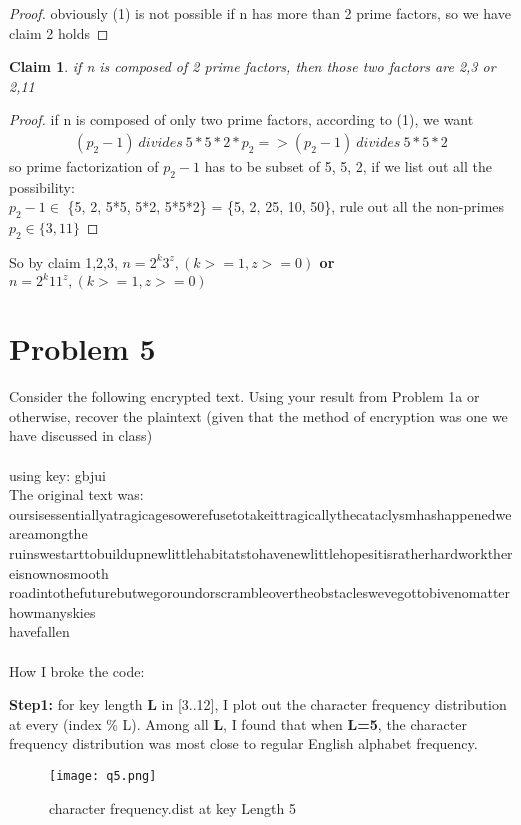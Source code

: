 \documentclass[12pt,letterpaper]{article}
\newtheorem{claim}{Claim}
\begin{document}
\begin{enumerate}
\begin{proof}
      obviously (1) is not possible if n has more than 2 prime factors, so we have claim 2 holds
    \end{proof}
    \begin{claim}
      if n is composed of 2 prime factors, then those two factors are {2,3} or {2,11}
    \end{claim}
    \begin{proof}
      if n is composed of only two prime factors, according to (1), we want
      \begin{align*}
        (p_2-1) \ divides \ 5*5*2*p_2 => (p_2-1) \ divides \ 5*5*2
      \end{align*}
      so prime factorization of $p_2-1$ has to be subset of {5, 5, 2}, if we list out all the possibility: \\
      $p_2-1 \in$ \{5, 2, 5*5, 5*2, 5*5*2\} = \{5, 2, 25, 10, 50\}, 
      rule out all the non-primes $p_2 \in  \{3, 11\}$ 
    \end{proof}
    So by claim 1,2,3,  \textbf{$n = 2^k3^z, (k >= 1, z >= 0)$ or $n = 2^k11^z, (k >= 1, z >= 0)$}
\end{enumerate}
\section*{Problem 5}
    Consider the following encrypted text. Using your result from Problem 1a or otherwise, recover the plaintext (given that the method of encryption was one we have discussed in class)\\ \\
    using key: gbjui \\
    The original text was:\\
    oursisessentiallyatragicagesowerefusetotakeittragicallythecataclysmhashappenedweareamongthe\\ruinswestarttobuildupnewlittlehabitatstohavenewlittlehopesitisratherhardworkthereisnownosmooth\\roadintothefuturebutwegoroundorscrambleovertheobstacleswevegottobivenomatterhowmanyskies\\havefallen\\ \\
    How I broke the code:

    \textbf{Step1:} for key length \textbf{L} in [3..12], I plot out the character frequency distribution at every (index \% L). Among all \textbf{L}, I found that when \textbf{L=5}, the character frequency distribution was most close to regular English alphabet frequency.
    \begin{figure}[!h]
    \centering
    \texttt{[image: q5.png]}
    \caption{character frequency.dist at key Length 5}
    \end{figure}
    
\end{document}
